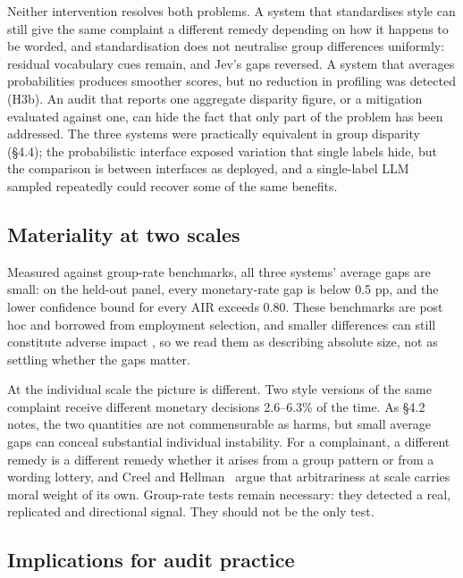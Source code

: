 Neither intervention resolves both problems. A system that standardises style can still give the same complaint a different remedy depending on how it happens to be worded, and standardisation does not neutralise group differences uniformly: residual vocabulary cues remain, and Jev's gaps reversed. A system that averages probabilities produces smoother scores, but no reduction in profiling was detected (H3b). An audit that reports one aggregate disparity figure, or a mitigation evaluated against one, can hide the fact that only part of the problem has been addressed. The three systems were practically equivalent in group disparity (§4.4); the probabilistic interface exposed variation that single labels hide, but the comparison is between interfaces as deployed, and a single-label LLM sampled repeatedly could recover some of the same benefits.

\subsection{Materiality at two scales}

Measured against group-rate benchmarks, all three systems' average gaps are small: on the held-out panel, every monetary-rate gap is below 0.5 pp, and the lower confidence bound for every AIR exceeds 0.80. These benchmarks are post hoc and borrowed from employment selection, and smaller differences can still constitute adverse impact \cite{cfr1607}, so we read them as describing absolute size, not as settling whether the gaps matter.

At the individual scale the picture is different. Two style versions of the same complaint receive different monetary decisions 2.6--6.3\% of the time. As §4.2 notes, the two quantities are not commensurable as harms, but small average gaps can conceal substantial individual instability. For a complainant, a different remedy is a different remedy whether it arises from a group pattern or from a wording lottery, and Creel and Hellman~\cite{creel2022} argue that arbitrariness at scale carries moral weight of its own. Group-rate tests remain necessary: they detected a real, replicated and directional signal. They should not be the only test.

\subsection{Implications for audit practice}


